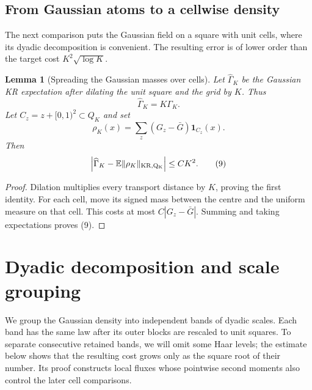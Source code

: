\documentclass{smfart}
\newtheorem{lemma}[theorem]{Lemma}
\theoremstyle{definition}
\newcommand{\1}{\mathbf 1}
\begin{document}
\subsection{From Gaussian atoms to a cellwise density}

The next comparison puts the Gaussian field on a square with unit cells,
where its dyadic decomposition is convenient.  The resulting error is of
lower order than the target cost $K^2\sqrt{\log K}$.

\begin{lemma}[Spreading the Gaussian masses over cells]\label{lem:atom-to-cell}
Let $\widehat\Gamma_ K$ be the Gaussian KR expectation after dilating the
unit square and the grid by $K$. Thus
\begin{equation*}
\widehat\Gamma_ K=K\Gamma_ K.
\end{equation*}
Let $C_ z=z+[0,1)^2\subset Q_ K$ and set
\begin{equation*}
\rho_ K(x)=\sum_ z(G_ z-\bar G)\mathbf1_ {C_ z}(x).
\end{equation*}
Then
\begin{equation}
\left|\widehat\Gamma_ K-
\mathbb E\|\rho_ K\|_ {\rm KR,Q_ K}\right|\leq CK^2.
\tag{9}
\end{equation}

\end{lemma}

\begin{proof}
Dilation multiplies every transport distance by $K$, proving the first
identity. For each cell, move its signed mass between the centre and the
uniform measure on that cell. This costs at most
$C|G_ z-\bar G|$. Summing and taking expectations proves (9).

\end{proof}

\section{Dyadic decomposition and scale grouping}\label{sec:dyadic}

We group the Gaussian density into independent bands of dyadic scales.
Each band has the same law after its outer blocks are rescaled to unit
squares.  To separate consecutive retained bands, we will omit some Haar
levels; the estimate below shows that the resulting cost grows only as
the square root of their number.  Its proof constructs local fluxes whose
pointwise second moments also control the later cell comparisons.
\end{document}
